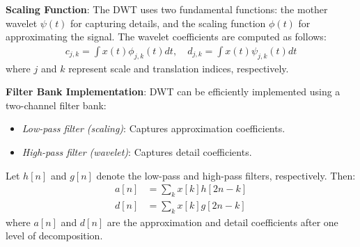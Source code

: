 \textbf{Scaling Function}: The DWT uses two fundamental functions: the mother wavelet $\psi(t)$ for capturing details, and the scaling function $\phi(t)$ for approximating the signal. The wavelet coefficients are computed as follows:
\begin{align}
    c_{j,k} = \int x(t) \phi_{j,k}(t) dt,\quad d_{j,k} = \int x(t) \psi_{j,k}(t) dt
\end{align}
where $j$ and $k$ represent scale and translation indices, respectively.

\textbf{Filter Bank Implementation}: DWT can be efficiently implemented using a two-channel filter bank:
\begin{itemize}
    \item \textit{Low-pass filter (scaling)}: Captures approximation coefficients.
    \item \textit{High-pass filter (wavelet)}: Captures detail coefficients.
\end{itemize}
Let $h[n]$ and $g[n]$ denote the low-pass and high-pass filters, respectively. Then:
\begin{align}
    a[n] &= \sum_{k} x[k] h[2n-k] \\
    d[n] &= \sum_{k} x[k] g[2n-k]
\end{align}
where $a[n]$ and $d[n]$ are the approximation and detail coefficients after one level of decomposition.
